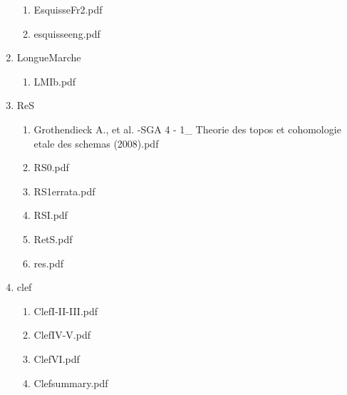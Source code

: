 \documentclass[11pt]{article}
\begin{document}
\begin{enumerate}
\begin{enumerate}
\item EsquisseFr2.pdf
\label{sec-1-1-1-1-29-34-17-2}

\item esquisseeng.pdf
\label{sec-1-1-1-1-29-34-17-3}
\end{enumerate}

\item LongueMarche
\label{sec-1-1-1-1-29-34-18}
\begin{enumerate}
\item LMIb.pdf
\label{sec-1-1-1-1-29-34-18-1}
\end{enumerate}

\item ReS
\label{sec-1-1-1-1-29-34-19}
\begin{enumerate}
\item Grothendieck A., et al. -SGA 4 - 1\_ Theorie des topos et cohomologie etale des schemas (2008).pdf
\label{sec-1-1-1-1-29-34-19-1}

\item RS0.pdf
\label{sec-1-1-1-1-29-34-19-2}

\item RS1errata.pdf
\label{sec-1-1-1-1-29-34-19-3}

\item RSI.pdf
\label{sec-1-1-1-1-29-34-19-4}

\item RetS.pdf
\label{sec-1-1-1-1-29-34-19-5}

\item res.pdf
\label{sec-1-1-1-1-29-34-19-6}
\end{enumerate}

\item clef
\label{sec-1-1-1-1-29-34-20}
\begin{enumerate}
\item ClefI-II-III.pdf
\label{sec-1-1-1-1-29-34-20-1}

\item ClefIV-V.pdf
\label{sec-1-1-1-1-29-34-20-2}

\item ClefVI.pdf
\label{sec-1-1-1-1-29-34-20-3}

\item Clefsummary.pdf
\label{sec-1-1-1-1-29-34-20-4}
\end{enumerate}
\end{enumerate}
\end{document}

